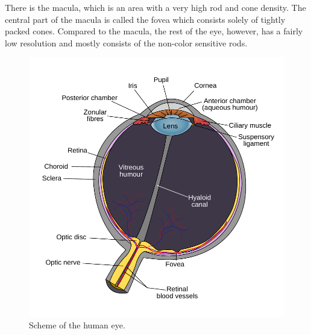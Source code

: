 \documentclass{sig-alternate-05-2015}
\begin{document}
There is the macula, which is an area with a very high rod and cone density.
The central part of the macula is called the fovea which consists solely of tightly packed cones.
Compared to the macula, the rest of the eye, however, has a fairly low resolution and mostly consists of the non-color sensitive rods.
%
\begin{figure}
    \centering
    \includegraphics[width=\columnwidth]{human_eye_scheme.pdf}
    \caption{Scheme of the human eye.}
    \label{fig:humaneye}
\end{figure}
%
%
\end{document}
